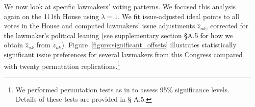 We now look at specific lawmakers' voting patterns.  We focused this
analysis again on the 111th House using $\lambda=1$. We fit
issue-adjusted ideal points to all votes in the House and computed
lawmakers' issue adjustments $\hat z_{uk}$, corrected for the
lawmaker's political leaning (see supplementary section \S A.5 for how
we obtain $\hat z_{uk}$ from $z_{uk}$).
Figure~\ref{figure:significant_offsets} illustrates statistically
significant issue preferences for several lawmakers from this Congress
compared with twenty permutation replications.\footnote{We performed
  permutation tests as in  to assess 95\%
  significance levels.  Details of these tests are provided in \S
  A.5.}




